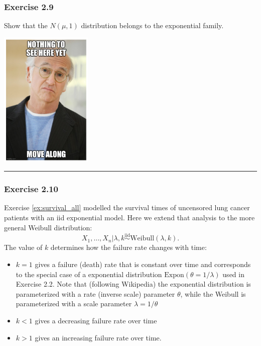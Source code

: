 \documentclass[
  letterpaper,
  DIV=11,
  numbers=noendperiod]{scrartcl}
\begin{document}
\subsubsection{Exercise 2.9}\label{exercise-2.9}

Show that the \(N(\mu,1)\) distribution belongs to the exponential
family.

\begin{tcolorbox}[enhanced jigsaw, coltitle=black, breakable, colbacktitle=quarto-callout-note-color!10!white, colframe=quarto-callout-note-color-frame, bottomrule=.15mm, toprule=.15mm, rightrule=.15mm, arc=.35mm, colback=white, opacityback=0, bottomtitle=1mm, leftrule=.75mm, title={Solution}, titlerule=0mm, toptitle=1mm, left=2mm, opacitybacktitle=0.6]

\includegraphics[width=1.73958in,height=\textheight,keepaspectratio]{../exercises/larry.png}

\end{tcolorbox}

\begin{center}\rule{0.5\linewidth}{0.5pt}\end{center}

\subsubsection{Exercise 2.10}\label{exercise-2.10}

Exercise \ref{ex:survival_all} modelled the survival times of uncensored
lung cancer patients with an iid exponential model. Here we extend that
analysis to the more general Weibull distribution: \[
X_1,\ldots,X_n \vert \lambda, k \overset{\mathrm{iid}}{\sim} \mathrm{Weibull}(\lambda,k).
\] The value of \(k\) determines how the failure rate changes with time:

\begin{itemize}
    \item $k=1$ gives a failure (death) rate that is constant over time and corresponds to the special case of a exponential distribution $\mathrm{Expon}(\theta=1/\lambda)$ used in Exercise 2.2. Note that (following Wikipedia) the exponential distribution is parameterized with a rate (inverse scale) parameter $\theta$, while the Weibull is parameterized with a scale parameter $\lambda= 1/\theta$
    \item $k<1$ gives a decreasing failure rate over time
    \item $k>1$ gives an increasing failure rate over time.
\end{itemize}
\end{document}

